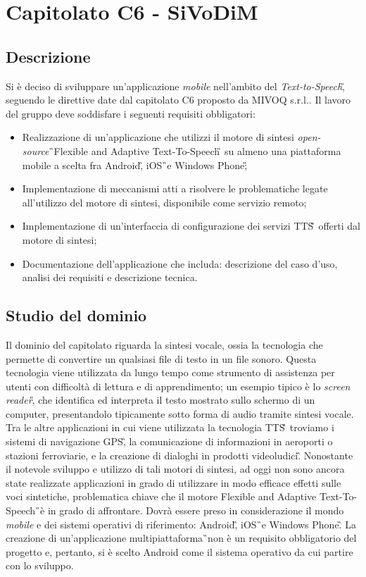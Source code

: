 \section{Capitolato C6 - SiVoDiM}
\subsection{Descrizione}
Si è deciso di sviluppare un'applicazione \textit{mobile} nell'ambito del \textit{Text-to-Speech}\G, seguendo le direttive date dal capitolato C6 proposto da MIVOQ s.r.l.. Il lavoro del gruppo deve soddisfare i seguenti requisiti obbligatori:
\begin{itemize}
\item Realizzazione di un'applicazione che utilizzi il motore di sintesi 
\textit{open-source}\G\ Flexible and Adaptive Text-To-Speech\G\, su almeno una 
piattaforma mobile a scelta fra Android\G, iOS\G\ e Windows Phone\G;
\item Implementazione di meccanismi atti a risolvere le problematiche legate all’utilizzo del motore di sintesi, disponibile come servizio remoto;
\item Implementazione di un'interfaccia di configurazione dei servizi TTS\G\, offerti dal motore di sintesi;
\item Documentazione dell'applicazione che includa: descrizione del caso d'uso, analisi dei requisiti e descrizione tecnica.
\end{itemize}

\subsection{Studio del dominio}
Il dominio del capitolato riguarda la sintesi vocale, ossia la tecnologia che 
permette di convertire un qualsiasi file di testo in un file sonoro. Questa 
tecnologia viene utilizzata da lungo tempo come strumento di assistenza per 
utenti con difficoltà di lettura e di apprendimento; un esempio tipico è lo 
\textit{screen reader\G}, che identifica ed interpreta il testo mostrato sullo 
schermo di un computer, presentandolo tipicamente sotto forma di audio tramite 
sintesi vocale. Tra le altre applicazioni in cui viene utilizzata la tecnologia 
TTS\G\, troviamo i sistemi di navigazione GPS\G, la comunicazione di 
informazioni in aeroporti o stazioni ferroviarie, e la creazione di dialoghi in 
prodotti videoludici\G. Nonostante il notevole sviluppo e utilizzo di tali 
motori di sintesi, ad oggi non sono ancora state realizzate applicazioni in 
grado di utilizzare in modo efficace effetti sulle voci sintetiche, 
problematica chiave che il motore Flexible and Adaptive Text-To-Speech\G\ è in 
grado di affrontare. Dovrà essere preso in considerazione il mondo \textit{mobile} e dei sistemi operativi di riferimento: Android\G, iOS\G\ e Windows Phone\G. La creazione di un'applicazione multipiattaforma\G\ non è un requisito obbligatorio del progetto e, pertanto, si è scelto Android come il sistema operativo da cui partire con lo sviluppo.

